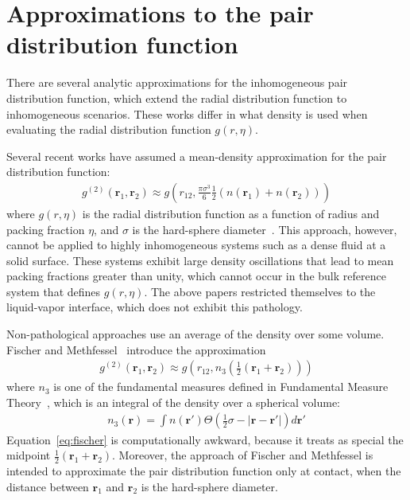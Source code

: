 \documentclass[letterpaper,twocolumn,amsmath,amssymb,pre,aps,10pt]{revtex4-1}
\newcommand{\rr}{\textbf{r}}
\begin{document}
\section{Approximations to the pair distribution function}
There are several analytic approximations for the inhomogeneous pair
distribution function, which extend the radial distribution function
to inhomogeneous scenarios.  These works differ in what density is
used when evaluating the radial distribution function $g(r,\eta)$.

Several recent works have assumed a mean-density approximation for
the pair distribution function:
\begin{align}
  g^{(2)}(\rr_1,\rr_2) \approx g\left(r_{12}, \tfrac{\pi\sigma^3}{6}\tfrac12
  (n(\rr_1)+n(\rr_2))\right)
\end{align}
where $g(r,\eta)$ is the radial distribution function as a function of
radius and packing fraction $\eta$, and $\sigma$ is the hard-sphere
diameter~\cite{gloor2007prediction, gross2009density}.  This approach,
however, cannot be applied to highly inhomogeneous systems such as a
dense fluid at a solid surface.  These systems exhibit large density
oscillations that lead to mean packing fractions greater than unity,
which cannot occur in the bulk reference system that defines $g(r,
\eta)$.  The above papers restricted themselves to the liquid-vapor
interface, which does not exhibit this pathology.

Non-pathological approaches use an average of the density over some
volume. Fischer and Methfessel~\cite{fischer1980born} introduce the
approximation
\begin{align}
  g^{(2)}(\rr_1,\rr_2) \approx g\left(r_{12}, n_3\left(\tfrac12
  (\rr_1+\rr_2)\right)\right)
  \label{eq:fischer}
\end{align}
where $n_3$ is one of the fundamental measures defined in Fundamental
Measure Theory~\cite{rosenfeld1989free}, which is an integral of the
density over a spherical volume:
\begin{align}
  n_3(\rr) = \int n(\rr')\Theta(\tfrac12 \sigma - |\rr-\rr'|) d\rr'
\end{align}
Equation~\ref{eq:fischer} is computationally awkward, because it
treats as special the midpoint $\tfrac12(\rr_1+\rr_2)$.  Moreover, the
approach of Fischer and Methfessel is intended to approximate the pair
distribution function only at contact, when the distance between
$\rr_1$ and $\rr_2$ is the hard-sphere diameter.
\end{document}
